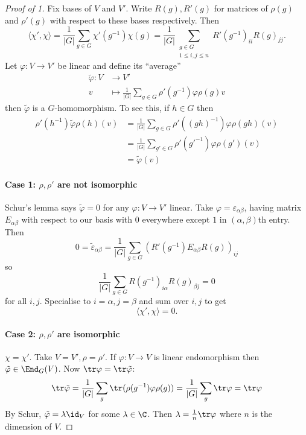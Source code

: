 \documentclass[a4paper]{article}
\theoremstyle{definition}
\begin{document}
\begin{proof}[Proof of  1]
  Fix bases of \(V\) and \(V'\). Write \(R(g), R'(g)\) for matrices of \(\rho(g)\) and \(\rho'(g)\) with respect to these bases respectively. Then
  \[
    \langle \chi', \chi \rangle
    = \frac{1}{|G|} \sum_{g \in G} \chi'(g^{-1}) \chi(g)
    = \frac{1}{|G|} \sum_{\substack{g \in G \\ 1 \leq i, j \leq n}} R'(g^{-1})_{ii} R(g)_{jj}.
  \]
  Let \(\varphi: V \to V'\) be linear and define its ``average''
  \begin{align*}
    \tilde \varphi: V &\to V' \\
    v &\mapsto \frac{1}{|G|} \sum_{g \in G} \rho'(g^{-1}) \varphi \rho(g) v
  \end{align*}
  then \(\tilde \varphi\) is a \(G\)-homomorphism. To see this, if \(h \in G\) then
  \begin{align*}
    \rho'(h^{-1}) \tilde \varphi \rho(h) (v)
    &= \frac{1}{|G|} \sum_{g \in G} \rho'((gh)^{-1}) \varphi \rho(gh) (v) \\
    &= \frac{1}{|G|} \sum_{g' \in G} \rho'(g'^{-1}) \varphi \rho(g') (v) \\
    &= \tilde \varphi(v)
  \end{align*}
  
\paragraph{Case 1: \(\rho, \rho'\) are not isomorphic}

Schur's lemma says \(\tilde \varphi = 0\) for any \(\varphi: V \to V'\) linear. Take \(\varphi = \varepsilon_{\alpha\beta}\), having matrix \(E_{\alpha\beta}\) with respect to our basis with \(0\) everywhere except \(1\) in \((\alpha, \beta)\)th entry. Then
\[
  0 = \tilde \varepsilon_{\alpha\beta}
  = \frac{1}{|G|} \sum_{g \in G} (R'(g^{-1}) E_{\alpha\beta} R(g))_{ij}
\]
so
\[
  \frac{1}{|G|} \sum_{g \in G} R(g^{-1})_{i\alpha} R(g)_{\beta j} = 0
\]
for all \(i, j\). Specialise to \(i = \alpha, j = \beta\) and sum over \(i, j\) to get
\[
  \langle \chi', \chi \rangle = 0.
\]

\paragraph{Case 2: \(\rho, \rho'\) are isomorphic}

\(\chi = \chi'\). Take \(V = V', \rho = \rho'\). If \(\varphi: V \to V\) is linear endomorphism then \(\tilde \varphi \in \End_G(V)\). Now \(\tr \varphi = \tr \tilde \varphi\):
\[
  \tr \tilde \varphi
  = \frac{1}{|G|} \sum_g \tr(\rho(g^{-1}) \varphi \rho(g))
  = \frac{1}{|G|} \sum_g \tr \varphi
  = \tr \varphi
\]
By Schur, \(\tilde \varphi = \lambda \id_V\) for some \(\lambda \in \C\). Then \(\lambda = \frac{1}{n} \tr \varphi\) where \(n\) is the dimension of \(V\).


\end{proof}
\end{document}
